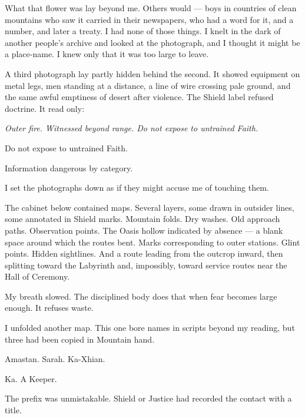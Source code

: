 What that flower was lay beyond me. Others would --- boys in countries of clean mountains who saw it carried in their newspapers, who had a word for it, and a number, and later a treaty. I had none of those things. I knelt in the dark of another people's archive and looked at the photograph, and I thought it might be a place-name. I knew only that it was too large to leave.\par

A third photograph lay partly hidden behind the second. It showed equipment on metal legs, men standing at a distance, a line of wire crossing pale ground, and the same awful emptiness of desert after violence. The Shield label refused doctrine. It read only:\par

\textit{Outer fire. Witnessed beyond range. Do not expose to untrained Faith.}\par

Do not expose to untrained Faith.\par

Information dangerous by category.\par

I set the photographs down as if they might accuse me of touching them.\par

The cabinet below contained maps. Several layers, some drawn in outsider lines, some annotated in Shield marks. Mountain folds. Dry washes. Old approach paths. Observation points. The Oasis hollow indicated by absence --- a blank space around which the routes bent. Marks corresponding to outer stations. Glint points. Hidden sightlines. And a route leading from the outcrop inward, then splitting toward the Labyrinth and, impossibly, toward service routes near the Hall of Ceremony.\par

My breath slowed. The disciplined body does that when fear becomes large enough. It refuses waste.\par

I unfolded another map. This one bore names in scripts beyond my reading, but three had been copied in Mountain hand.\par

Amastan. Sarah. Ka-Xhian.\par

Ka. A Keeper.\par

The prefix was unmistakable. Shield or Justice had recorded the contact with a title.\par

